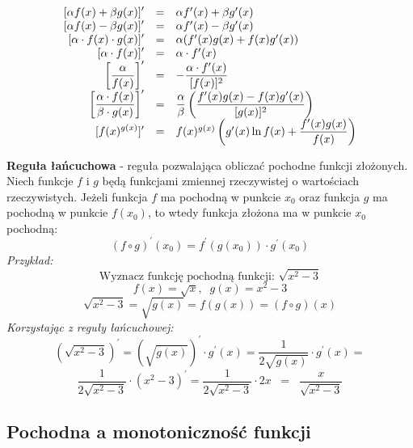\documentclass[14pt,a4paper]{extarticle}
\begin{document}
{%
\renewcommand{\arraystretch}{2}

\begin{equation*}
\begin{array}{rcl}
   \displaystyle[\alpha f(x) + \beta g(x)]^{\prime} & = & \alpha f^{\prime}(x) + \beta g^{\prime}(x) \\
   \displaystyle[\alpha f(x) - \beta g(x)]^{\prime} & = & \alpha f^{\prime}(x) - \beta g^{\prime}(x) \\
   \displaystyle[\alpha \cdot f(x)\cdot g(x)]^{\prime} & = & \alpha (f^{\prime}(x) g(x) + f(x) g^{\prime}(x)) \\
   \displaystyle[\alpha \cdot f(x)]^{\prime} & = & \alpha \cdot f^{\prime}(x) \\
   \displaystyle\left[\frac{\alpha}{f(x)}\right]^{\prime} & = & -\dfrac{\alpha \cdot f^{\prime}(x)}{[f(x)]^{2}} \\[\medskipamount]
   \displaystyle\left[\frac{\alpha \cdot f(x)}{\beta \cdot g(x)}\right]^{\prime} & = & \dfrac{\alpha}{\beta} \left( \dfrac{ f^{\prime}(x) g(x) - f(x) g^{\prime}(x)}{[g(x)]^{2}}\right)\\
   \displaystyle [f(x)^{g(x)}]^{\prime} & = & f(x)^{g(x)}\left(g^{\prime}(x)\ln f(x) + \dfrac{f^{\prime}(x)g(x)}{f(x)}\right)
\end{array}   
\end{equation*}

}%

\noindent\textbf{Reguła łańcuchowa} - reguła pozwalająca obliczać pochodne funkcji złożonych.
Niech funkcje $f$ i $g$ będą funkcjami zmiennej rzeczywistej o wartościach rzeczywistych.
Jeżeli funkcja $f$ ma pochodną w punkcie $x_{0}$ oraz funkcja $g$ ma pochodną w punkcie $f(x_{0})$,
to wtedy funkcja złożona ma w punkcie $x_{0}$ pochodną:
$$(f\circ g)^{\prime}(x_{0}) = f^{\prime}(g(x_{0})) \cdot g^{\prime}(x_{0})$$
\textit{Przykład:}
$$\text{Wyznacz funkcję pochodną funkcji: }\sqrt{x^{2}-3}$$
$$f(x) = \sqrt{x},\;\; g(x) = x^{2}-3$$
$$\sqrt{x^{2}-3} = \sqrt{g(x)} = f(g(x)) = (f \circ g)(x)$$
\textit{Korzystając z reguły łańcuchowej:}
$$(\sqrt{x^{2}-3})^{\prime} = \left(\sqrt{g(x)}\right)^{\prime}\cdot g^{\prime}(x) = \frac{1}{2\sqrt{g(x)}} \cdot g^{\prime}(x) = $$
$$\frac{1}{2\sqrt{x^{2} - 3}} \cdot (x^{2}-3)^{\prime} = \frac{1}{2\sqrt{x^{2} - 3}} \cdot 2x \;\;=\;\; \frac{x}{\sqrt{x^{2} - 3}}$$

\subsection{Pochodna a monotoniczność funkcji}
\end{document}

